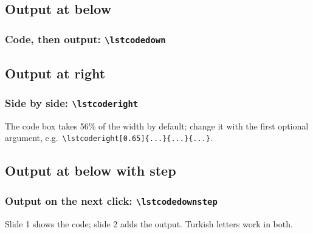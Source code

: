 \documentclass[aspectratio=169,10pt,compress]{beamer}
\begin{document}


\subsection[down]{Output at below}

\begin{frame}[t,fragile] \frametitle{Code, then output: \texttt{\textbackslash lstcodedown}}
\end{frame}





\subsection[right]{Output at right}

\begin{frame}[t,fragile] \frametitle{Side by side: \texttt{\textbackslash lstcoderight}}

  \vspace{0.5em}
  \small The code box takes 56\% of the width by default; change it with the first optional
  argument, e.g.\ \verb|\lstcoderight[0.65]{...}{...}{...}|.
\end{frame}



\subsection[downStep]{Output at below with step}

\begin{frame}[t,fragile] \frametitle{Output on the next click: \texttt{\textbackslash lstcodedownstep}}

  \small Slide 1 shows the code; slide 2 adds the output. Turkish letters work in both.
\end{frame}
\end{document}
